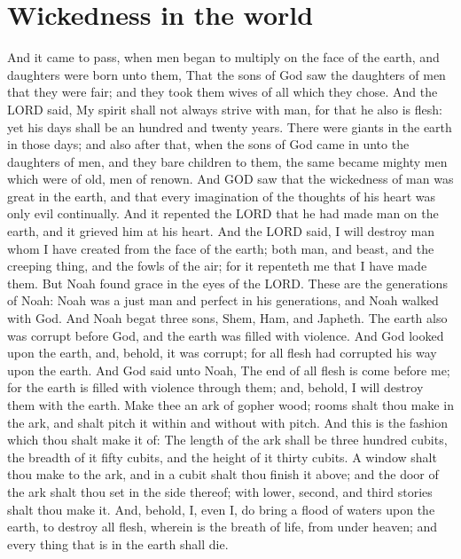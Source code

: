 \section*{Wickedness in the world}
\begin{biblechapter} %
\verse And it came to pass, when men began to multiply on the face of the earth, and daughters were born unto them,
\verse That the sons of God saw the daughters of men that they were fair; and they took them wives of all which they chose.
\verse And the LORD said, My spirit shall not always strive with man, for that he also is flesh: yet his days shall be an hundred and twenty years.
\verse There were giants in the earth in those days; and also after that, when the sons of God came in unto the daughters of men, and they bare children to them, the same became mighty men which were of old, men of renown.
\verse And GOD saw that the wickedness of man was great in the earth, and that every imagination of the thoughts of his heart was only evil continually.
\verse And it repented the LORD that he had made man on the earth, and it grieved him at his heart.
\verse And the LORD said, I will destroy man whom I have created from the face of the earth; both man, and beast, and the creeping thing, and the fowls of the air; for it repenteth me that I have made them.
\verse But Noah found grace in the eyes of the LORD.
\verse These are the generations of Noah: Noah was a just man and perfect in his generations, and Noah walked with God.
\verse And Noah begat three sons, Shem, Ham, and Japheth.
\verse The earth also was corrupt before God, and the earth was filled with violence.
\verse And God looked upon the earth, and, behold, it was corrupt; for all flesh had corrupted his way upon the earth.
\verse And God said unto Noah, The end of all flesh is come before me; for the earth is filled with violence through them; and, behold, I will destroy them with the earth.
\verse Make thee an ark of gopher wood; rooms shalt thou make in the ark, and shalt pitch it within and without with pitch.
\verse And this is the fashion which thou shalt make it of: The length of the ark shall be three hundred cubits, the breadth of it fifty cubits, and the height of it thirty cubits.
\verse A window shalt thou make to the ark, and in a cubit shalt thou finish it above; and the door of the ark shalt thou set in the side thereof; with lower, second, and third stories shalt thou make it.
\verse And, behold, I, even I, do bring a flood of waters upon the earth, to destroy all flesh, wherein is the breath of life, from under heaven; and every thing that is in the earth shall die.

\end{biblechapter}
